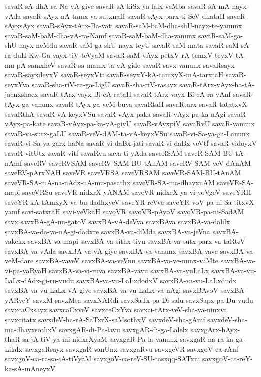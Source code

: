 {savaR-sA-dhA-ra-Na-vA-give
savaR-sA-kiSx-ya-lalx-veMba
savaR-sA-mA-nayx-vAda
savaR-sAyx-nA-tamx-va-sutxnaH
savaR-sAyx-parx-ti-SeV-dhataH
savaR-sAyxsAyx
savaR-sAyx-tAtx-Ba-vati
savaR-saM-baM-dha-shU-nayx-te-yanunx
savaR-saM-baM-dha-vA-ra-Namf
savaR-saM-baM-dha-vanunx
savaR-saM-ga-shU-nayx-neMdu
savaR-saM-ga-shU-nayx-teyU
savaR-saM-mata
savaR-saM-sA-ra-duH-Kw-Ga-vayx-tiV-teVyaM
savaR-saM-vAyx-petxV-rA-temxV-teyxV-tA-mu-pA-samxheV
savaR-sa-mamx-ta-vA-gide
savaR-savx-vanunx
savaRsayx
savaR-sayxdevxV
savaR-seyxVti
savaR-seyxY-kA-tamxyX-mA-tarxtaH
savaR-seyxYva
savaR-sha-riV-ra-ga-LigU
savaR-sha-riV-rasayx
savaR-tArx-vAyx-ha-tA-jacnxshacx
savaR-tArx-vayx-Bi-cA-rataH
savaR-tArx-vayx-Bi-cA-ra-vAnf
savaR-tAyx-ga-vanunx
savaR-tAyx-ga-veM-buva
savaRtaH
savaRtarx
savaR-tatatxvX
savaRthA
savaR-vA-keyxVSu
savaR-vAyx-paka
savaR-vAyx-pa-ka-nAgi
savaR-vAyx-pa-kate
savaR-vAyx-pa-ka-vA-giyU
savaR-vAyxpiV
savaRvU
savaR-vanunx
savaR-va-sutx-gaLU
savaR-veV-dAM-ta-vA-keyxVSu
savaR-vi-Sa-ya-ga-Lanunx
savaR-vi-Sa-ya-garx-haNa
savaR-vi-daBx-jati
savaR-vi-daBx-veVtf
savaR-vidoyxV
savaR-vitUtx
savaR-vitf
savaRvu
sava-ti-yAda
saveRSAM
saveR-SAM-BU-tA-nAmf
saveRV
saveRVSAM
saveRV-SAM-BU-tAnAM
saveRV-SAM-veV-dAnAM
saveRV-pArxNAH
saveVR
saveVRSA
saveVRSAM
saveVR-SAM-BU-tAnAM
saveVR-SA-mA-na-nAdx-nA-mu-pasathx
saveVR-SA-ma-dhavxnAM
saveVR-SA-mapi
saveVRSu
saveVR-nidxrX-yANAM
saveVR-nidxrX-ya-vi-yoVgeV
saveYRH
saveYR-kA-tAmxyX-va-bu-dadhxyeV
saveYR-reVva
saveYR-voV-pa-ni-Sa-titxvX-yamf
savi-satxraH
savi-veVkaH
savoVR
savoVR-pAyoV
savoVR-pa-ni-SadAM
savx
savxBA-gA-nu-gatoV
savxBA-vA-deVva
savxBAva
savxBA-va-dalilx
savxBA-va-da-va-nA-gi-dadxre
savxBA-va-diMda
savxBA-va-jeVna
savxBA-vakekx
savxBA-va-mapi
savxBA-va-sithx-tiyu
savxBA-va-sutx-parx-va-taRteV
savxBA-va-vAda
savxBA-va-vA-giye
savxBA-va-vanunx
savxBA-vave
savxBA-va-veM-dare
savxBA-vaveV
savxBA-va-veVnu
savxBA-va-ve-nunx-vaMte
savxBA-va-vi-pa-yaRyaH
savxBA-va-vi-ruva
savxBA-vavu
savxBA-va-vuLaLx
savxBA-va-vu-LaLx-dAdx-gi-ru-vudu
savxBA-va-vu-LaLxdodxV
savxBA-va-vu-LaLxdudx
savxBA-va-vu-LaLx-vA-give
savxBA-va-vu-LaLx-va-nAgi
savxBAvoV
savxBA-yARyeY
savxM
savxMta
savxNARdi
savxSaTx-pa-Di-salu
savxSapx-pa-Du-vudu
savxcaCxsayx
savxcaCxveV
savxceCxYva
savxci-tAtx-veV-sha-ya-ninxva
savxcitatx
savxdeV-ha-rA-SaTxrX-saMsothxV
savxdeV-sha-gAmf
savxdeV-sha-ma-dhayxsothxV
savxgAR-di-Pa-lavu
savxgAR-di-ga-Lalelx
savxgArx-hAyx-thaR-sa-jA-tiV-ya-mi-nidxrXyaM
savxgaR-Pa-la-vanunx
savxgaR-na-ra-ka-ga-Lilalx
savxgaRsayx
savxgaR-vanUnx
savxgaRvu
savxgeVR
savxgoV-ca-rAnf
savxgoV-ca-ra-sa-jA-tiVyaM
savxgoV-ca-reV-SU-tasxqq-SATxni
savxgoV-ca-reY-ka-sA-mAneyxV
}
